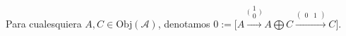 \documentclass[preview]{standalone}
\begin{document}
\begin{center}
Para cualesquiera $A,C\in\text{Obj}(\mathscr{A})$, denotamos $0:= \big[ A \xrightarrow{\big(\begin{smallmatrix}1 \\ 0\end{smallmatrix}\big)} A\bigoplus C \xrightarrow{(\begin{smallmatrix} 0 &1 \end{smallmatrix})} C \big].$
\end{center}
\end{document}
